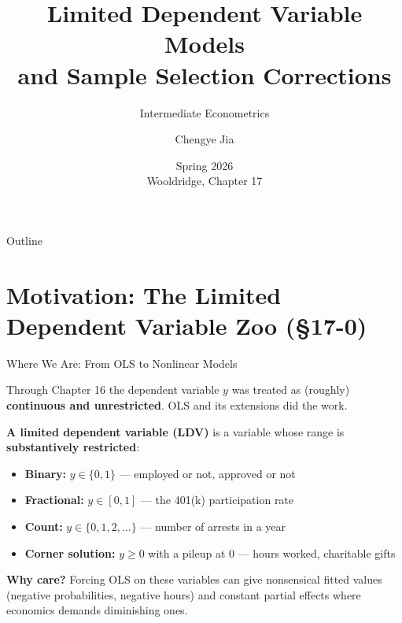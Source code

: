 \documentclass[aspectratio=169, 12pt]{beamer}
\title[L17: Limited Dependent Variables]{Limited Dependent Variable Models \\ and Sample Selection Corrections}
\subtitle{Intermediate Econometrics}
\author[SUFE Econometrics]{Chengye Jia}
\institute{%
  Department of Economics \\
  Shandong University of Finance and Economics}
\date{Spring 2026 \\ \smallskip \scriptsize Wooldridge, Chapter 17}
\begin{document}

\begin{frame}[plain]
  \titlepage
\end{frame}

\begin{frame}[shrink=10]{Outline}
  \tableofcontents
\end{frame}

\section{Motivation: The Limited Dependent Variable Zoo (\S17-0)}

\begin{frame}[shrink=8]{Where We Are: From OLS to Nonlinear Models}

  Through Chapter 16 the dependent variable $y$ was treated as (roughly)
  \textbf{continuous and unrestricted}. OLS and its extensions did the work.

  \smallskip

  \begin{keybox}
    \textbf{A limited dependent variable (LDV)} is a variable whose range is
    \textbf{substantively restricted}:
    \begin{itemize}
      \item \textbf{Binary:} $y \in \{0,1\}$ --- employed or not, approved or not
      \item \textbf{Fractional:} $y \in [0,1]$ --- the 401(k) participation rate
      \item \textbf{Count:} $y \in \{0,1,2,\ldots\}$ --- number of arrests in a year
      \item \textbf{Corner solution:} $y \ge 0$ with a pileup at $0$ --- hours worked, charitable gifts
    \end{itemize}
  \end{keybox}

  \smallskip

  \begin{highlightbox}
    \textbf{Why care?} Forcing OLS on these variables can give nonsensical
    fitted values (negative probabilities, negative hours) and constant partial
    effects where economics demands diminishing ones.
  \end{highlightbox}

\end{frame}
\end{document}
